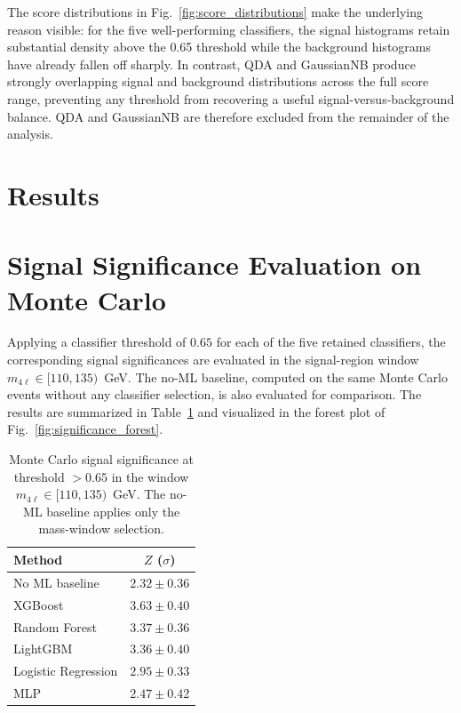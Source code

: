\documentclass[conference]{IEEEtran}
\begin{document}
{The score distributions in Fig.~\ref{fig:score_distributions} make the underlying reason visible: for the five well-performing classifiers, the signal histograms retain substantial density above the 0.65 threshold while the background histograms have already fallen off sharply. In contrast, QDA and GaussianNB produce strongly overlapping signal and background distributions across the full score range, preventing any threshold from recovering a useful signal-versus-background balance. QDA and GaussianNB are therefore excluded from the remainder of the analysis.

\section*{Results}

\section{Signal Significance Evaluation on Monte Carlo}

Applying a classifier threshold of $0.65$ for each of the five retained classifiers, the corresponding signal significances are evaluated in the signal-region window $m_{4\ell} \in [110, 135)$~GeV. The no-ML baseline, computed on the same Monte Carlo events without any classifier selection, is also evaluated for comparison. The results are summarized in Table~\ref{tab:mc_significance} and visualized in the forest plot of Fig.~\ref{fig:significance_forest}.

\begin{table}[h]
\centering
\caption{Monte Carlo signal significance at threshold $>0.65$ in the window $m_{4\ell} \in [110, 135)$~GeV. The no-ML baseline applies only the mass-window selection.}
\label{tab:mc_significance}
\begin{tabular}{l c}
\hline
\textbf{Method} & $Z$ ($\sigma$) \\
\hline
No ML baseline       & $2.32 \pm 0.36$ \\
XGBoost              & $3.63 \pm 0.40$ \\
Random Forest        & $3.37 \pm 0.36$ \\
LightGBM             & $3.36 \pm 0.40$ \\
Logistic Regression  & $2.95 \pm 0.33$ \\
MLP                  & $2.47 \pm 0.42$ \\
\hline
\end{tabular}
\end{table}

}
\end{document}
